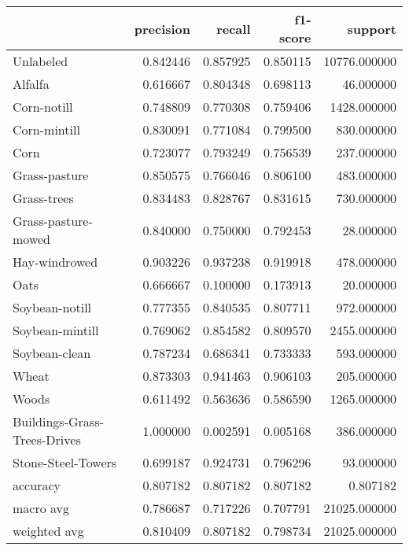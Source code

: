 \begin{tabular}{lrrrr}
\toprule
{} &  precision &    recall &  f1-score &       support \\
\midrule
Unlabeled                    &   0.842446 &  0.857925 &  0.850115 &  10776.000000 \\
Alfalfa                      &   0.616667 &  0.804348 &  0.698113 &     46.000000 \\
Corn-notill                  &   0.748809 &  0.770308 &  0.759406 &   1428.000000 \\
Corn-mintill                 &   0.830091 &  0.771084 &  0.799500 &    830.000000 \\
Corn                         &   0.723077 &  0.793249 &  0.756539 &    237.000000 \\
Grass-pasture                &   0.850575 &  0.766046 &  0.806100 &    483.000000 \\
Grass-trees                  &   0.834483 &  0.828767 &  0.831615 &    730.000000 \\
Grass-pasture-mowed          &   0.840000 &  0.750000 &  0.792453 &     28.000000 \\
Hay-windrowed                &   0.903226 &  0.937238 &  0.919918 &    478.000000 \\
Oats                         &   0.666667 &  0.100000 &  0.173913 &     20.000000 \\
Soybean-notill               &   0.777355 &  0.840535 &  0.807711 &    972.000000 \\
Soybean-mintill              &   0.769062 &  0.854582 &  0.809570 &   2455.000000 \\
Soybean-clean                &   0.787234 &  0.686341 &  0.733333 &    593.000000 \\
Wheat                        &   0.873303 &  0.941463 &  0.906103 &    205.000000 \\
Woods                        &   0.611492 &  0.563636 &  0.586590 &   1265.000000 \\
Buildings-Grass-Trees-Drives &   1.000000 &  0.002591 &  0.005168 &    386.000000 \\
Stone-Steel-Towers           &   0.699187 &  0.924731 &  0.796296 &     93.000000 \\
accuracy                     &   0.807182 &  0.807182 &  0.807182 &      0.807182 \\
macro avg                    &   0.786687 &  0.717226 &  0.707791 &  21025.000000 \\
weighted avg                 &   0.810409 &  0.807182 &  0.798734 &  21025.000000 \\
\bottomrule
\end{tabular}
